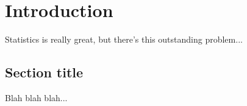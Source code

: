 \chapter{Introduction} 

Statistics is really great, but there's this outstanding problem...

\section{Section title}
Blah blah blah...


